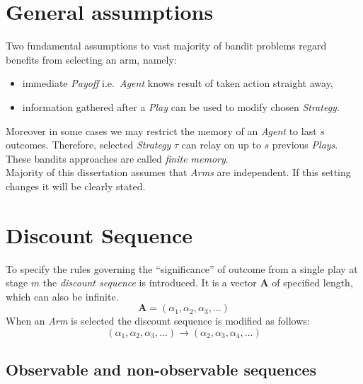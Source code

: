 \documentclass[12pt, a4paper, pdflatex]{report}
\begin{document}
\section{General assumptions}
Two fundamental assumptions to vast majority of bandit problems regard benefits from selecting an arm, namely:
\begin{itemize}
\item immediate \emph{Payoff} i.e.\ \emph{Agent} knows result of taken action straight away,
\item information gathered after a \emph{Play} can be used to modify chosen \emph{Strategy}.
\end{itemize}
Moreover in some cases we may restrict the memory of an \emph{Agent} to last $s$ outcomes. Therefore, selected \emph{Strategy} $\tau$ can relay on up to $s$ previous \emph{Plays}. These bandits approaches are called \emph{finite memory}.\\
Majority of this dissertation assumes that \emph{Arms} are independent. If this setting changes it will be clearly stated.


\section{Discount Sequence}
To specify the rules governing the ``significance'' of outcome from a single play at stage $m$ the \emph{discount sequence} is introduced. It is a vector $\mathbf{A}$ of specified length, which can also be infinite.
$$
\mathbf{A} = \left( \alpha_1, \alpha_2, \alpha_3, ... \right)
$$
When an \emph{Arm} is selected the discount sequence is modified as follows:
$$
\left( \alpha_1, \alpha_2, \alpha_3, ... \right)
\rightarrow
\left( \alpha_2, \alpha_3, \alpha_4, ... \right)
$$

\subsection{Observable and non-observable sequences}
\lipsum[1]
\end{document}
